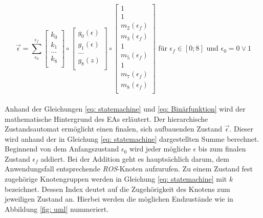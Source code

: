 	\begin{equation}
	\vec{\epsilon}=\sum_{\epsilon_0}^{\epsilon_f} \left[ \begin{array}{r}
	k_0  \\
	k_{1}  \\
	...  \\
	k_8  \\
	\end{array}\right] \circ
	\left[ \begin{array}{r}
	g_0(\epsilon)  \\
	g_{1}(\epsilon)  \\
	...  \\
	g_8(z)  \\
	\end{array}\right]  \circ
	\left[ \begin{array}{r}
	1  \\
	1  \\
	m_{2}(\epsilon_f)  \\
	m_{3}(\epsilon_f)   \\
	1  \\
	m_{5}(\epsilon_f)  \\
	1   \\
	m_{7}(\epsilon_f)   \\
	m_8(\epsilon_f)  \\
	\end{array}\right]
	\text{ für }\epsilon_f\in[0;8] \text{ und }\epsilon_0=0 \vee 1
	\label{eq: statemachine}
	\end{equation}\\
	
		Anhand der Gleichungen \ref{eq: statemachine} und \ref{eq: Binärfunktion} wird der mathematische Hintergrund des EAs erläutert. Der hierarchische Zustandsautomat ermöglicht einen finalen, sich aufbauenden Zustand $\vec{\epsilon}$. Dieser wird anhand der in Gleichung \ref{eq: statemachine} dargestellten Summe berechnet.\\
		
		Beginnend von dem Anfangszustand $\epsilon_0$ wird jeder mögliche $\epsilon$ bis zum finalen Zustand $\epsilon_f$ addiert. Bei der Addition geht es hauptsächlich darum, dem Anwendungsfall entsprechende \textit{ROS}-Knoten aufzurufen. Zu einem Zustand fest zugehörige Knotengruppen werden in Gleichung \ref{eq: statemachine} mit $k$ bezeichnet. Dessen Index deutet auf die Zugehörigkeit des Knotens zum jeweiligen Zustand an. Hierbei werden die möglichen Endzustände wie in Abbildung \ref{fig: uml} nummeriert.\\
		
